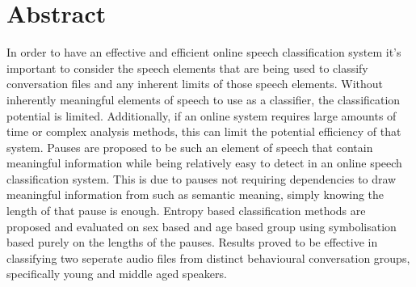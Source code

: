 \chapter{Abstract}

In order to have an effective and efficient online speech classification system it's important to consider the speech elements that are being used to classify conversation files and any inherent limits of those speech elements. Without inherently meaningful elements of speech to use as a classifier, the classification potential is limited. Additionally, if an online system requires large amounts of time or complex analysis methods, this can limit the potential efficiency of that system. Pauses are proposed to be such an element of speech that contain meaningful information while being relatively easy to detect in an online speech classification system. This is due to pauses not requiring dependencies to draw meaningful information from such as semantic meaning, simply knowing the length of that pause is enough. Entropy based classification methods are proposed and evaluated on sex based and age based group using symbolisation based purely on the lengths of the pauses. Results proved to be effective in classifying two seperate audio files from distinct behavioural conversation groups, specifically young and middle aged speakers.